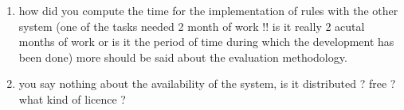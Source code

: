 \begin{enumerate}[leftmargin=0mm,label=\bfseries CommentR1.\arabic*]
\item \label{Review1.5} 
how did you compute the time for the implementation of rules 
with the other system (one of the tasks needed 2 month of work 
!! is it really 2 acutal months of work or is it the period of 
time during which the development has been done)
more should be said about the evaluation methodology.


\item \label{Review1.5}
you say nothing about the availability of the system, 
is it distributed ? free ? what kind of licence ?


\end{enumerate}
